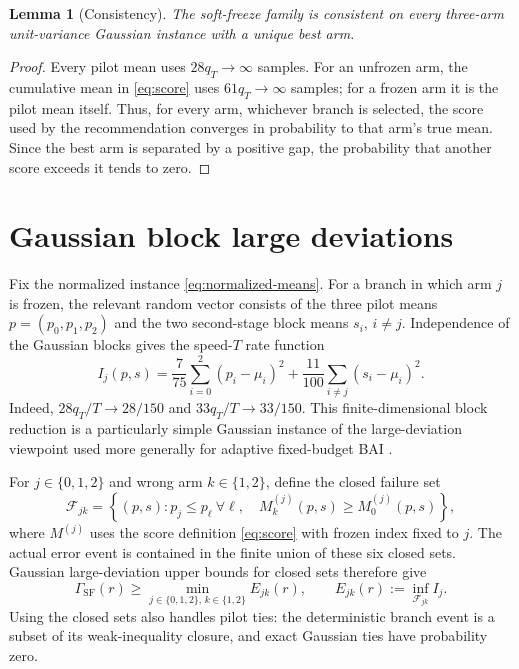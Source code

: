 \documentclass[11pt]{article}
\newtheorem{lemma}[theorem]{Lemma}
\theoremstyle{definition}
\theoremstyle{remark}
\newcommand{\SF}{\mathrm{SF}}
\begin{document}
\begin{lemma}[Consistency]
The soft-freeze family is consistent on every three-arm unit-variance Gaussian instance with a unique best arm.
\end{lemma}
\begin{proof}
Every pilot mean uses $28q_T\to\infty$ samples. For an unfrozen arm, the cumulative mean in \eqref{eq:score} uses $61q_T\to\infty$ samples; for a frozen arm it is the pilot mean itself. Thus, for every arm, whichever branch is selected, the score used by the recommendation converges in probability to that arm's true mean. Since the best arm is separated by a positive gap, the probability that another score exceeds it tends to zero.
\end{proof}

\section{Gaussian block large deviations}

Fix the normalized instance \eqref{eq:normalized-means}. For a branch in which arm $j$ is frozen, the relevant random vector consists of the three pilot means $p=(p_0,p_1,p_2)$ and the two second-stage block means $s_i$, $i\ne j$. Independence of the Gaussian blocks gives the speed-$T$ rate function
\begin{equation}
I_j(p,s)
=
\frac{7}{75}\sum_{i=0}^2(p_i-\mu_i)^2
+
\frac{11}{100}\sum_{i\ne j}(s_i-\mu_i)^2.
\label{eq:rate-function}
\end{equation}
Indeed, $28q_T/T\to28/150$ and $33q_T/T\to33/150$. This finite-dimensional block reduction is a particularly simple Gaussian instance of the large-deviation viewpoint used more generally for adaptive fixed-budget BAI \cite{wang2023}.

For $j\in\{0,1,2\}$ and wrong arm $k\in\{1,2\}$, define the closed failure set
\begin{equation}
\mathcal F_{jk}
=
\left\{(p,s):
 p_j\le p_\ell\ \forall \ell,\quad
 M_k^{(j)}(p,s)\ge M_0^{(j)}(p,s)
\right\},
\label{eq:failure-set}
\end{equation}
where $M^{(j)}$ uses the score definition \eqref{eq:score} with frozen index fixed to $j$. The actual error event is contained in the finite union of these six closed sets. Gaussian large-deviation upper bounds for closed sets therefore give
\begin{equation}
\Gamma_{\SF}(r)
\ge
\min_{j\in\{0,1,2\},\,k\in\{1,2\}}
E_{jk}(r),
\qquad
E_{jk}(r):=\inf_{\mathcal F_{jk}} I_j.
\label{eq:union-bound-rate}
\end{equation}
Using the closed sets also handles pilot ties: the deterministic branch event is a subset of its weak-inequality closure, and exact Gaussian ties have probability zero.
\end{document}

